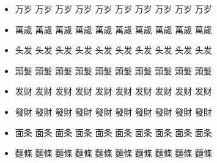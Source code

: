 \documentclass{article}
\begin{document}
\begin{CJK}{UTF8}{gbsn}
\begin{itemize}
\item
{\Huge          万岁}
{\huge          万岁}
{\LARGE         万岁}
{\Large         万岁}
{\large         万岁}
{\normalsize    万岁}
{\small         万岁}
{\footnotesize  万岁}
{\scriptsize    万岁}
{\tiny          万岁}
\item
{\Huge          萬歲}
{\huge          萬歲}
{\LARGE         萬歲}
{\Large         萬歲}
{\large         萬歲}
{\normalsize    萬歲}
{\small         萬歲}
{\footnotesize  萬歲}
{\scriptsize    萬歲}
{\tiny          萬歲}
\item
{\Huge          头发}
{\huge          头发}
{\LARGE         头发}
{\Large         头发}
{\large         头发}
{\normalsize    头发}
{\small         头发}
{\footnotesize  头发}
{\scriptsize    头发}
{\tiny          头发}
\item
{\Huge          頭髮}
{\huge          頭髮}
{\LARGE         頭髮}
{\Large         頭髮}
{\large         頭髮}
{\normalsize    頭髮}
{\small         頭髮}
{\footnotesize  頭髮}
{\scriptsize    頭髮}
{\tiny          頭髮}
\item
{\Huge          发财}
{\huge          发财}
{\LARGE         发财}
{\Large         发财}
{\large         发财}
{\normalsize    发财}
{\small         发财}
{\footnotesize  发财}
{\scriptsize    发财}
{\tiny          发财}
\item
{\Huge          發財}
{\huge          發財}
{\LARGE         發財}
{\Large         發財}
{\large         發財}
{\normalsize    發財}
{\small         發財}
{\footnotesize  發財}
{\scriptsize    發財}
{\tiny          發財}
\item
{\Huge          面条}
{\huge          面条}
{\LARGE         面条}
{\Large         面条}
{\large         面条}
{\normalsize    面条}
{\small         面条}
{\footnotesize  面条}
{\scriptsize    面条}
{\tiny          面条}
\item
{\Huge          麵條}
{\huge          麵條}
{\LARGE         麵條}
{\Large         麵條}
{\large         麵條}
{\normalsize    麵條}
{\small         麵條}
{\footnotesize  麵條}
{\scriptsize    麵條}
{\tiny          麵條}
\end{itemize}
\end{CJK}
\end{document}
